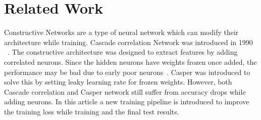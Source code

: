 \section{Related Work}
Constructive Networks are a type of neural network which can modify their architecture while training. Cascade correlation Network was introduced in 1990 ~\cite{CascadeCorrelation1990}. The constructive architecture was designed to extract features by adding correlated neurons. Since the hidden neurons have weights frozen once added, the performance may be bad due to early poor neurons~\cite{CASPER1997}. Casper was introduced to solve this by setting leaky learning rate for frozen weights. However, both Cascade correlation and Casper network still suffer from accuracy drops while adding neurons. In this article a new training pipeline is introduced to improve the training loss while training and the final test results.